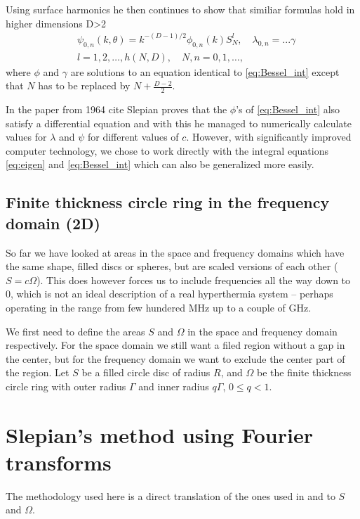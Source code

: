 \documentclass[11pt,a4paper, 
english, swedish %
]{article}
\begin{document}

Using surface harmonics he then continues to show that similiar formulas hold in higher dimensions D>2
\begin{align}
  &\psi_{0,n}(k,\theta)=k^{-(D-1)/2}\phi_{0,n}(k)S_N^l, \quad \lambda_{0,n}= ...\gamma \\
  &l= 1,2, \ldots , h(N,D), \quad N,n=0,1, \ldots,
\end{align}
where $\phi$ and $\gamma$ are solutions to an equation identical to \eqref{eq:Bessel_int} except that $N$ has to be replaced by $N+\frac{D-2}{2}$. 

In the paper from 1964 cite Slepian proves that the $\phi$'s of \eqref{eq:Bessel_int} also satisfy a differential equation and with this he managed to numerically calculate values for $\lambda$ and $\psi$ for different values of $c$. However, with significantly improved computer technology, we chose to work directly with the integral equations \eqref{eq:eigen} and \eqref{eq:Bessel_int} which can also be generalized more easily.
  




\subsection{Finite thickness circle ring in the frequency domain (2D)}
So far we have looked at areas in the space and frequency domains
which have the same shape, filled discs or spheres, but are scaled
versions of each other ($S=c\Omega$). This does however forces us to
include frequencies all the way down to 0, which is not an ideal
description of a real hyperthermia system -- perhaps operating in the
range from few hundered MHz up to a couple of GHz.

We first need to define the areas $S$ and $\Omega$ in the space and
frequency domain respectively. For the space domain we still want a
filed region without a gap in the center, but for the frequency domain
we want to exclude the center part of the region. Let $S$ be a filled
circle disc of radius $R$, and $\Omega$ be the finite thickness circle
ring with outer radius $\Gamma$ and inner radius $q\Gamma$, $0\le q<1$.

\section{Slepian's method using Fourier transforms}
The methodology used here is a direct translation of the ones used in
\cite{PSWF-I_1961} and \cite{PSWF-IV_1964} to $S$ and $\Omega$.
\end{document}
